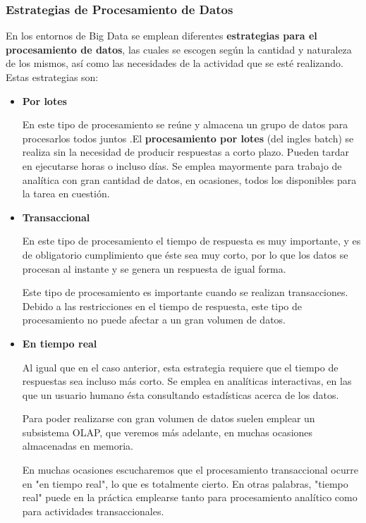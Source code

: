 \subsubsection{Estrategias de Procesamiento de Datos}
En los entornos de Big Data se emplean diferentes \textbf{estrategias para el procesamiento de datos}, las cuales se escogen según la cantidad y naturaleza de los mismos, así como las necesidades de la actividad que se esté realizando. Estas estrategias son:

\begin{itemize}
	\item \textbf{Por lotes}
	
	En este tipo de procesamiento se reúne y almacena un grupo de datos para procesarlos todos juntos \cite{aws02}.El \textbf{procesamiento por lotes} (del ingles batch) se realiza sin la necesidad de producir respuestas a corto plazo. Pueden tardar en ejecutarse horas o incluso días. Se emplea mayormente para trabajo de analítica con gran cantidad de datos, en ocasiones, todos los disponibles para la tarea en cuestión.
	
	\item \textbf{Transaccional}
	
	En este tipo de procesamiento el tiempo de respuesta es muy importante, y es de obligatorio cumplimiento que éste sea muy corto, por lo que los datos se procesan al instante y se genera un respuesta de igual forma. 
	
	Este tipo de procesamiento es importante cuando se realizan transacciones. Debido a las restricciones en el tiempo de respuesta, este tipo de procesamiento no puede afectar a un gran volumen de datos.
	
	\item \textbf{En tiempo real}
	
	Al igual que en el caso anterior, esta estrategia requiere que el tiempo de respuestas sea incluso más corto. Se emplea en analíticas interactivas, en las que un usuario humano ésta consultando estadísticas acerca de los datos. 
	
	Para poder realizarse con gran volumen de datos suelen emplear un subsistema OLAP, que veremos más adelante, en muchas ocasiones almacenadas en memoria. 
	
	En muchas ocasiones escucharemos que el procesamiento transaccional ocurre en "en tiempo real", lo que es totalmente cierto. En otras palabras, "tiempo real" puede en la práctica emplearse tanto para procesamiento analítico como para actividades transaccionales.
	

\end{itemize}
